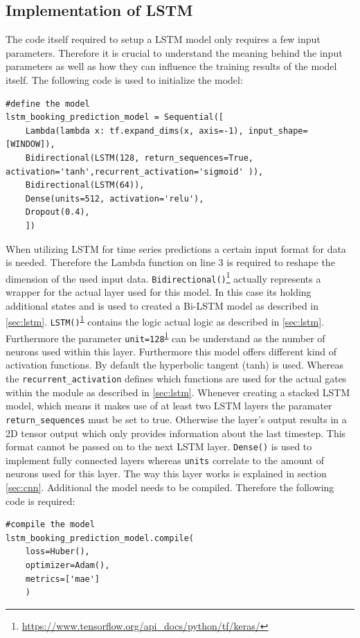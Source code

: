 \subsection{Implementation of LSTM}
The code itself required to setup a LSTM model only requires a few input parameters. Therefore it is crucial to understand the meaning behind the input parameters as well as how they can influence the training results of the model itself. The following code is used to initialize the model:   
\begin{lstlisting}
#define the model
lstm_booking_prediction_model = Sequential([
    Lambda(lambda x: tf.expand_dims(x, axis=-1), input_shape=[WINDOW]),
    Bidirectional(LSTM(128, return_sequences=True, activation='tanh',recurrent_activation='sigmoid' )),
    Bidirectional(LSTM(64)),
    Dense(units=512, activation='relu'),
    Dropout(0.4),
	])
\end{lstlisting}
When utilizing LSTM for time series predictions a certain input format for data is needed. Therefore the Lambda function on line 3 is required to reshape the dimension of the used input data. 
\verb|Bidirectional()|\footnote{\label{tf_fn}\url{https://www.tensorflow.org/api_docs/python/tf/keras/}} actually represents a wrapper for the actual layer used for this model. In this case its holding additional states and is used to created a Bi-LSTM model as described in \ref{sec:lstm}. \newline
\verb|LSTM()|\textsuperscript{\ref{tf_fn}} contains the logic actual logic as described in \ref{sec:lstm}. Furthermore the parameter \verb|unit=128|\textsuperscript{\ref{tf_fn}} can be understand as the number of neurons used within this layer. Furthermore this model offers different kind of activation functions. By default the hyperbolic tangent (tanh)\cite{tanh} is used. Whereas the \verb|recurrent_activation| defines which functions are used for the actual gates within the module as described in \ref{sec:lstm}. Whenever creating a stacked LSTM model, which means it makes use of at least two LSTM layers the paramater \verb|return_sequences| must be set to true. Otherwise the layer's output results in a 2D tensor output which only provides information about the last timestep. This format cannot be passed on to the next LSTM layer. \newline
\verb|Dense()| is used to implement fully connected layers whereas \verb|units| correlate to the amount of neurons used for this layer. The way this layer works is explained in section \ref{sec:cnn}. Additional the model needs to be compiled. Therefore the following code is required: 
\begin{lstlisting}
#compile the model 
lstm_booking_prediction_model.compile(
    loss=Huber(),
    optimizer=Adam(),
    metrics=['mae']
	)
\end{lstlisting}



